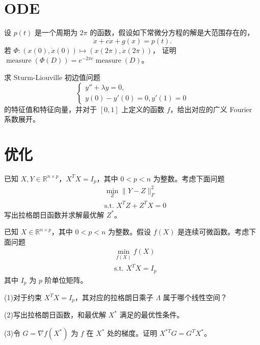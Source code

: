 \section{ODE}

\begin{problem}
设 \( p(t) \) 是一个周期为 \( 2\pi \) 的函数，假设如下常微分方程的解是大范围存在的，
\[
\ddot{x} + c\dot{x} + g(x) = p(t).
\]
若 \(\Phi : (x(0), \dot{x}(0)) \mapsto (x(2\pi), \dot{x}(2\pi))\)，
证明 \( \operatorname{measure}(\Phi(D)) = e^{-2\pi c}\operatorname{measure}(D) \)。
\end{problem}

\begin{problem}
求 Sturm-Liouville 初边值问题
\[
\begin{cases}
y'' + \lambda y = 0, \\
y(0) - y'(0) = 0, y'(1) = 0
\end{cases}
\]
的特征值和特征向量，并对于 \([0, 1]\) 上定义的函数 \( f \)，给出对应的广义 Fourier 系数展开。
\end{problem}

\section{优化}

\begin{problem}
已知 \( X, Y \in \mathbb{R}^{n \times p} \)，\( X^T X = I_p \)，其中 \( 0 < p < n \) 为整数。考虑下面问题
\[
\begin{aligned}
&\min_{Z} \|Y - Z\|_F^2 \\
&\text{s.t. } X^T Z + Z^T X = 0
\end{aligned}
\]
写出拉格朗日函数并求解最优解 \( Z^* \)。
\end{problem}

\begin{problem}
已知 \( X \in \mathbb{R}^{n \times p} \)，其中 \( 0 < p < n \) 为整数。假设 \( f(X) \) 是连续可微函数。考虑下面问题
\[
\begin{aligned}
&\min_{f(X)} f(X) \\
&\text{s.t. } X^T X = I_p
\end{aligned}
\]
其中 \( I_p \) 为 \( p \) 阶单位矩阵。

(1)对于约束 \( X^T X = I_p \)，其对应的拉格朗日乘子 \( \Lambda \) 属于哪个线性空间？

(2)写出拉格朗日函数，和最优解 \( X^* \) 满足的最优性条件。

(3)令 \( G = \nabla f(X^*) \) 为 \( f \) 在 \( X^* \) 处的梯度。证明 \( X^{*T} G = G^T X^* \)。
\end{problem}